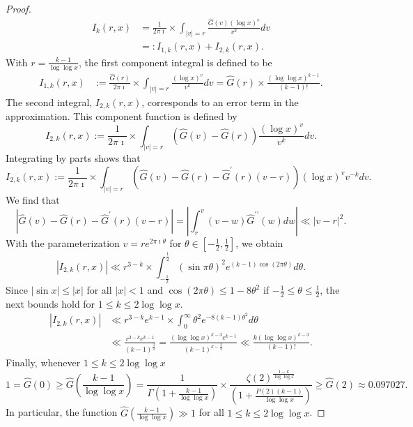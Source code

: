 \documentclass[11pt,reqno,a4letter]{article}
\numberwithin{equation}{section}
\numberwithin{figure}{section}
\numberwithin{table}{section}
\newcommand{\cf}{\textit{cf.\ }}
\theoremstyle{plain}
\numberwithin{theorem}{section}
\theoremstyle{definition}
\begin{document}
\begin{proof}
\begin{align*}
I_k(r, x) & = \frac{1}{2\pi\imath} \times \int_{|v|=r} 
     \frac{\widehat{G}(v) (\log x)^{v}}{v^k} dv \\ 
     & =: I_{1,k}(r, x) + I_{2,k}(r, x). 
\end{align*}
With $r = \frac{k-1}{\log\log x}$, the 
first component integral is defined to be 
\begin{align*}
I_{1,k}(r, x) & := \frac{\widehat{G}(r)}{2\pi\imath} \times \int_{|v|=r} 
     \frac{(\log x)^{v}}{v^k} dv = \widehat{G}(r) \times \frac{(\log\log x)^{k-1}}{(k-1)!}. 
\end{align*}
The second integral, $I_{2,k}(r, x)$, corresponds to an error term in the approximation. 
This component function is defined by 
\[
I_{2,k}(r, x) := \frac{1}{2\pi\imath} \times \int_{|v|=r} 
     \left(\widehat{G}(v) - \widehat{G}(r)\right) 
     \frac{(\log x)^{v}}{v^k} dv. 
\]
Integrating by parts shows that \cite[\cf Thm.\ 7.19; \S 7.4]{MV} 
\[
I_{2,k}(r, x) := \frac{1}{2\pi\imath} \times \int_{|v|=r} 
     \left(\widehat{G}(v) - \widehat{G}(r) - 
     \widehat{G}^{\prime}(r)(v-r)\right) 
     (\log x)^{v} v^{-k} dv. 
\]
We find that 
\[
\left\lvert \widehat{G}(v) - \widehat{G}(r) - \widehat{G}^{\prime}(r)(v-r) \right\rvert = 
     \left\lvert \int_{r}^{v} (v-w) \widehat{G}^{\prime\prime}(w) dw \right\rvert 
     \ll |v-r|^2. 
\]
With the parameterization $v = re^{2\pi\imath\theta}$ for 
$\theta \in \left[-\frac{1}{2}, \frac{1}{2}\right]$, we obtain 
\[
|I_{2,k}(r, x)| \ll r^{3-k} \times 
     \int_{-\frac{1}{2}}^{\frac{1}{2}} (\sin \pi\theta)^2 e^{(k-1) \cos(2\pi\theta)} d\theta. 
\]
Since $|\sin x| \leq |x|$ for all $|x| < 1$ and $\cos(2\pi\theta) \leq 1 - 8\theta^2$ if 
$-\frac{1}{2} \leq \theta \leq \frac{1}{2}$, the next bounds hold for 
$1 \leq k \leq 2\log\log x$. 
\begin{align*}
|I_{2,k}(r, x)| & \ll r^{3-k} e^{k-1} \times \int_0^{\infty} \theta^2 e^{-8(k-1) \theta^2} d\theta \\ 
     & \ll \frac{r^{3-k} e^{k-1}}{(k-1)^{\frac{3}{2}}} = 
     \frac{(\log\log x)^{k-3} e^{k-1}}{(k-1)^{k-\frac{3}{2}}} 
     \ll 
     \frac{k (\log\log x)^{k-3}}{(k-1)!}. 
\end{align*}
Finally, whenever $1 \leq k \leq 2\log\log x$ 
\[
1 = \widehat{G}(0) \geq \widehat{G}\left(\frac{k-1}{\log\log x}\right) = 
     \frac{1}{\Gamma\left(1+\frac{k-1}{\log\log x}\right)} \times 
     \frac{\zeta(2)^{\frac{1-k}{\log\log x}}}{\left(1+\frac{P(2)(k-1)}{\log\log x}\right)} 
     \geq \widehat{G}(2) \approx 0.097027. 
\]
In particular, the function 
$\widehat{G}\left(\frac{k-1}{\log\log x}\right) \gg 1$ for 
all $1 \leq k \leq 2\log\log x$. 
\end{proof} 
\end{document}
